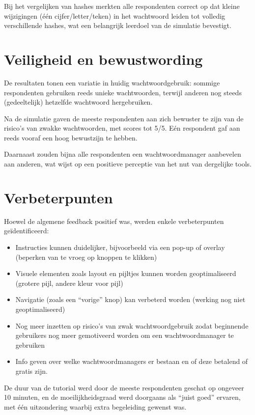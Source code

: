 Bij het vergelijken van hashes merkten alle respondenten correct op dat kleine wijzigingen (één cijfer/letter/teken) in het wachtwoord leiden tot volledig verschillende hashes, wat een belangrijk leerdoel van de simulatie bevestigt.

\section{Veiligheid en bewustwording}

De resultaten tonen een variatie in huidig wachtwoordgebruik: sommige respondenten gebruiken reeds unieke wachtwoorden, terwijl anderen nog steeds (gedeeltelijk) hetzelfde wachtwoord hergebruiken.

Na de simulatie gaven de meeste respondenten aan zich bewuster te zijn van de risico’s van zwakke wachtwoorden, met scores tot 5/5. Eén respondent gaf aan reeds vooraf een hoog bewustzijn te hebben.

Daarnaast zouden bijna alle respondenten een wachtwoordmanager aanbevelen aan anderen, wat wijst op een positieve perceptie van het nut van dergelijke tools.

\section{Verbeterpunten}

Hoewel de algemene feedback positief was, werden enkele verbeterpunten geïdentificeerd:

\begin{itemize}
\item Instructies kunnen duidelijker, bijvoorbeeld via een pop-up of overlay (beperken van te vroeg op knoppen te klikken)
\item Visuele elementen zoals layout en pijltjes kunnen worden geoptimaliseerd (grotere pijl, andere kleur voor pijl)
\item Navigatie (zoals een “vorige” knop) kan verbeterd worden (werking nog niet geoptimaliseerd)
\item Nog meer inzetten op risico's van zwak wachtwoordgebruik zodat beginnende gebruikers nog meer gemotiveerd worden om een wachtwoordmanager te gebruiken
\item Info geven over welke wachtwoordmanagers er bestaan en of deze betalend of gratis zijn.
\end{itemize}

De duur van de tutorial werd door de meeste respondenten geschat op ongeveer 10 minuten, en de moeilijkheidsgraad werd doorgaans als “juist goed” ervaren, met één uitzondering waarbij extra begeleiding gewenst was.